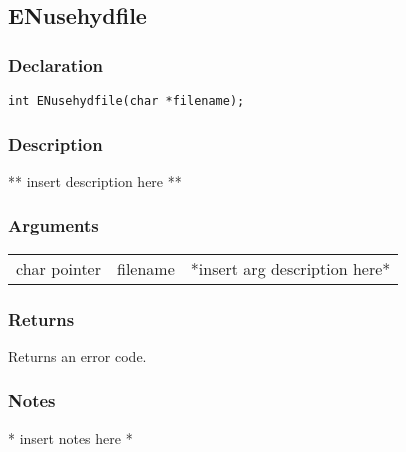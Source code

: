 \subsection{ENusehydfile}
\subsubsection{Declaration}
\begin{lstlisting}
int ENusehydfile(char *filename);
\end{lstlisting}
\subsubsection{Description}
** insert description here **
\subsubsection{Arguments}
\begin{tabular}{l r p{11cm} }
char pointer&filename&*insert arg description here* \\[6pt]
\end{tabular}
\subsubsection{Returns}
Returns an error code.
\subsubsection{Notes}
* insert notes here *